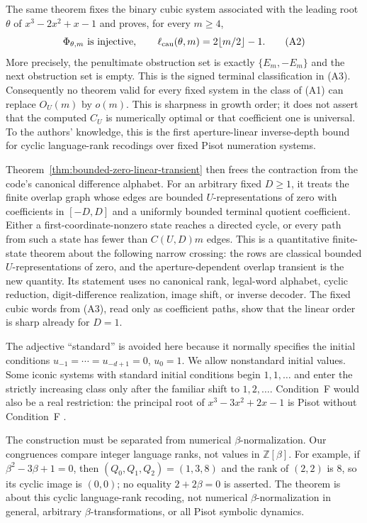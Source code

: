 The same theorem fixes the binary cubic system associated with the leading
root $\theta$ of $x^3-2x^2+x-1$ and proves, for every $m\ge4$,
\[
\Phi_{\theta,m}\text{ is injective},\qquad
\ell_{\rm cau}(\theta,m)=2\lfloor m/2\rfloor-1. \tag{A2}
\]
More precisely, the penultimate obstruction set is exactly
$\{E_m,-E_m\}$ and the next obstruction set is empty.  This is the signed
terminal classification in \textup{(A3)}.  Consequently no theorem valid for
every fixed system in the class of \textup{(A1)} can replace $O_U(m)$ by
$o(m)$.  This is sharpness in growth order; it does not assert that the
computed $C_U$ is numerically optimal or that coefficient one is universal.
To the authors' knowledge, this is the first aperture-linear inverse-depth
bound for cyclic language-rank recodings over fixed Pisot numeration systems.

Theorem~\ref{thm:bounded-zero-linear-transient} then frees the contraction
from the code's canonical difference alphabet.  For an arbitrary fixed
$D\ge1$, it treats the finite overlap graph whose edges are bounded
$U$-representations of zero with coefficients in $[-D,D]$ and a uniformly
bounded terminal quotient coefficient.  Either a first-coordinate-nonzero
state reaches a directed cycle, or every path from such a state has fewer
than $C(U,D)m$ edges.  This is a quantitative finite-state theorem about the
following narrow crossing: the rows are classical bounded
$U$-representations of zero, and the aperture-dependent overlap transient is
the new quantity.  Its statement uses no
canonical rank, legal-word alphabet, cyclic reduction, digit-difference
realization, image shift, or inverse decoder.  The fixed cubic words from
\textup{(A3)}, read only as coefficient paths, show that the linear order is
sharp already for $D=1$.

The adjective ``standard'' is avoided here because it normally specifies the
initial conditions $u_{-1}=\cdots=u_{-d+1}=0$, $u_0=1$.  We allow
nonstandard initial values.  Some iconic systems with standard initial
conditions begin $1,1,\ldots$ and enter the strictly increasing class only
after the familiar shift to $1,2,\ldots$.  Condition~F would also be a real
restriction: the principal root of $x^3-3x^2+2x-1$ is Pisot without
Condition~F \cite[Theorem~3]{Akiyama2000}.

The construction must be separated from numerical $\beta$-normalization.
Our congruences compare integer language ranks, not values in
$\mathbb Z[\beta]$.  For example, if $\beta^2-3\beta+1=0$, then
$(Q_0,Q_1,Q_2)=(1,3,8)$ and the rank of $(2,2)$ is $8$, so its cyclic image
is $(0,0)$; no equality $2+2\beta=0$ is asserted.  The theorem is about this
cyclic language-rank recoding, not numerical $\beta$-normalization in general,
arbitrary $\beta$-transformations, or all Pisot symbolic dynamics.

